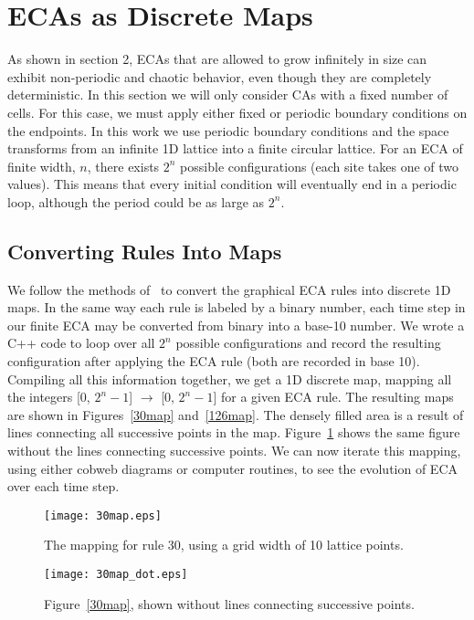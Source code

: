 \section{ECAs as Discrete Maps}

As shown in section 2, ECAs that are allowed to grow infinitely in size can exhibit non-periodic and chaotic behavior, even though they are completely deterministic.   
In this section we will only consider CAs with a fixed number of cells.  
For this case, we must apply either fixed or periodic boundary conditions on the endpoints.  
In this work we use periodic boundary conditions and the space transforms from an infinite 1D lattice into a finite circular lattice.  
For an ECA of finite width, $n$, there exists $2^n$ possible configurations (each site takes one of two values).  
This means that every initial condition will eventually end in a periodic loop, although the period could be as large as $2^n$.  

\subsection{Converting Rules Into Maps}

We follow the methods of~\cite{sed} to convert the graphical ECA rules into discrete 1D maps.  
In the same way each rule is labeled by a binary number, each time step in our finite ECA may be converted from binary into a base-10 number.  
We wrote a \textsc{C++} code to loop over all $2^n$ possible configurations and record the resulting configuration after applying the ECA rule (both are recorded in base 10).  
Compiling all this information together, we get a 1D discrete map, mapping all the integers [0, $2^n -1$] $\rightarrow$ [0, $2^n -1$] for a given ECA rule.  
The resulting maps are shown in Figures~\ref{30map} and~\ref{126map}.  
The densely filled area is a result of lines connecting all successive points in the map.  
Figure~\ref{30map_dot} shows the same figure without the  lines connecting successive points.  
We can now iterate this mapping, using either cobweb diagrams or computer routines, to see the evolution of ECA over each time step.  

\begin{figure}
    \begin{minipage}[b]{0.49\textwidth}
        \centering
        \texttt{[image: 30map.eps]}
        \caption{\label{30map} The mapping for rule 30, using a grid width of 10 lattice points.  }
    \end{minipage}
    \hspace{0.5cm}
    \begin{minipage}[b]{0.49\textwidth}
        \centering
        \texttt{[image: 30map\_dot.eps]}
        \caption{\label{30map_dot} Figure~\ref{30map}, shown without lines connecting successive points.}
    \end{minipage}
\end{figure}

